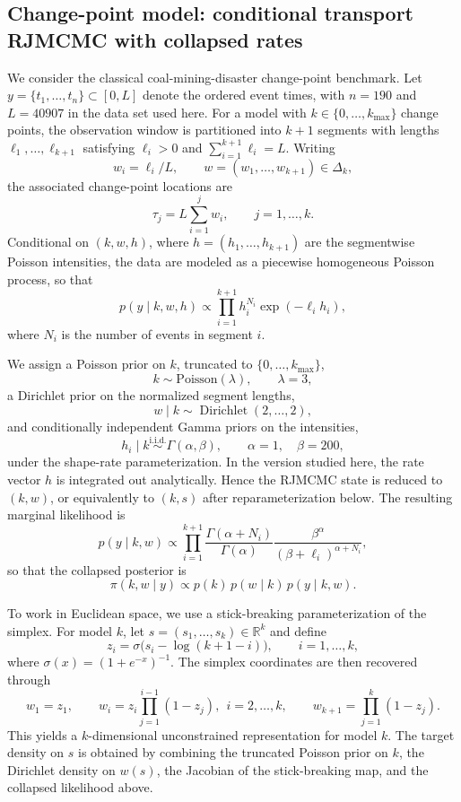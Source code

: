 \subsection{Change-point model: conditional transport RJMCMC with collapsed rates}

We consider the classical coal-mining-disaster change-point benchmark. Let
$y=\{t_1,\dots,t_n\}\subset[0,L]$ denote the ordered event times, with
$n=190$ and $L=40907$ in the data set used here. For a model with
$k\in\{0,\dots,k_{\max}\}$ change points, the observation window is partitioned
into $k+1$ segments with lengths $\ell_1,\dots,\ell_{k+1}$ satisfying
$\ell_i>0$ and $\sum_{i=1}^{k+1}\ell_i=L$. Writing
\[
w_i=\ell_i/L,\qquad w=(w_1,\dots,w_{k+1})\in\Delta_k,
\]
the associated change-point locations are
\[
\tau_j=L\sum_{i=1}^j w_i,\qquad j=1,\dots,k.
\]
Conditional on $(k,w,h)$, where $h=(h_1,\dots,h_{k+1})$ are the segmentwise
Poisson intensities, the data are modeled as a piecewise homogeneous Poisson
process, so that
\[
p(y\mid k,w,h)\propto \prod_{i=1}^{k+1} h_i^{N_i}\exp(-\ell_i h_i),
\]
where $N_i$ is the number of events in segment $i$.

We assign a Poisson prior on $k$, truncated to $\{0,\dots,k_{\max}\}$,
\[
k \sim \text{Poisson}(\lambda),\qquad \lambda=3,
\]
a Dirichlet prior on the normalized segment lengths,
\[
w\mid k \sim \operatorname{Dirichlet}(2,\dots,2),
\]
and conditionally independent Gamma priors on the intensities,
\[
h_i\mid k \stackrel{\text{i.i.d.}}{\sim} \Gamma(\alpha,\beta),
\qquad \alpha=1,\quad \beta=200,
\]
under the shape-rate parameterization. In the version studied here, the rate
vector $h$ is integrated out analytically. Hence the RJMCMC state is reduced to
$(k,w)$, or equivalently to $(k,s)$ after reparameterization below. The
resulting marginal likelihood is
\[
p(y\mid k,w)\propto
\prod_{i=1}^{k+1}
\frac{\Gamma(\alpha+N_i)}{\Gamma(\alpha)}
\frac{\beta^\alpha}{(\beta+\ell_i)^{\alpha+N_i}},
\]
so that the collapsed posterior is
\[
\pi(k,w\mid y)\propto p(k)\,p(w\mid k)\,p(y\mid k,w).
\]

To work in Euclidean space, we use a stick-breaking parameterization of the
simplex. For model $k$, let $s=(s_1,\dots,s_k)\in\mathbb{R}^k$ and define
\[
z_i=\sigma\!\bigl(s_i-\log(k+1-i)\bigr),\qquad i=1,\dots,k,
\]
where $\sigma(x)=(1+e^{-x})^{-1}$. The simplex coordinates are then recovered
through
\[
w_1=z_1,\qquad
w_i=z_i\prod_{j=1}^{i-1}(1-z_j),\ \ i=2,\dots,k,\qquad
w_{k+1}=\prod_{j=1}^{k}(1-z_j).
\]
This yields a $k$-dimensional unconstrained representation for model $k$. The
target density on $s$ is obtained by combining the truncated Poisson prior on
$k$, the Dirichlet density on $w(s)$, the Jacobian of the stick-breaking map,
and the collapsed likelihood above.

